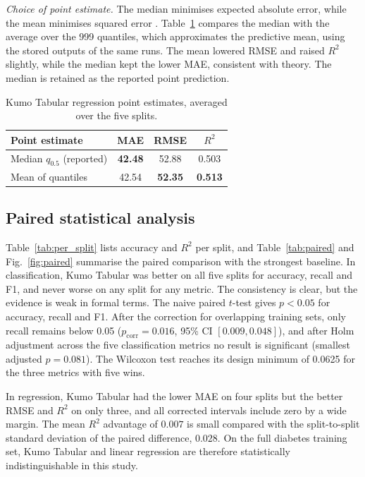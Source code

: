 \documentclass{ieeeaccess}
\begin{document}
\emph{Choice of point estimate.} The median minimises expected absolute error, while the mean minimises squared error \cite{gneiting2007scoring}. Table~\ref{tab:point} compares the median with the average over the 999 quantiles, which approximates the predictive mean, using the stored outputs of the same runs. The mean lowered RMSE and raised $R^2$ slightly, while the median kept the lower MAE, consistent with theory. The median is retained as the reported point prediction.

\begin{table}[t]
\centering
\caption{Kumo Tabular regression point estimates, averaged over the five splits.}
\label{tab:point}
\begin{tabular}{lccc}
\toprule
Point estimate & MAE & RMSE & $R^2$ \\
\midrule
Median $q_{0.5}$ (reported) & \textbf{42.48} & 52.88 & 0.503 \\
Mean of quantiles & 42.54 & \textbf{52.35} & \textbf{0.513} \\
\bottomrule
\end{tabular}
\end{table}

\subsection{Paired statistical analysis}
Table~\ref{tab:per_split} lists accuracy and $R^2$ per split, and Table~\ref{tab:paired} and Fig.~\ref{fig:paired} summarise the paired comparison with the strongest baseline. In classification, Kumo Tabular was better on all five splits for accuracy, recall and F1, and never worse on any split for any metric. The consistency is clear, but the evidence is weak in formal terms. The naive paired $t$-test gives $p<0.05$ for accuracy, recall and F1. After the correction for overlapping training sets, only recall remains below 0.05 ($p_{\mathrm{corr}}=0.016$, 95\% CI $[0.009,0.048]$), and after Holm adjustment across the five classification metrics no result is significant (smallest adjusted $p=0.081$). The Wilcoxon test reaches its design minimum of 0.0625 for the three metrics with five wins.

In regression, Kumo Tabular had the lower MAE on four splits but the better RMSE and $R^2$ on only three, and all corrected intervals include zero by a wide margin. The mean $R^2$ advantage of $0.007$ is small compared with the split-to-split standard deviation of the paired difference, $0.028$. On the full diabetes training set, Kumo Tabular and linear regression are therefore statistically indistinguishable in this study.
\end{document}
